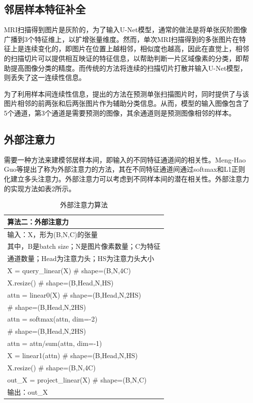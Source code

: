 \documentclass[letterpaper, 10pt, conference, twoside]{ieeeconf}
\begin{document}
\subsection{邻居样本特征补全}
MRI扫描得到图片是灰阶的，为了输入U-Net模型，通常的做法是将单张灰阶图像广播到3个特征维上，以扩增张量维度。然而，单次MRI扫描得到的多张图片在特征上是连续变化的，即图片在位置上越相邻，相似度也越高，因此在直觉上，相邻的扫描切片可以提供相互映证的特征信息，以帮助判断一片区域像素的分类，即帮助提高图像分类的精度。而传统的方法将连续的扫描切片打散并输入U-Net模型，则丢失了这一连续性信息。

为了利用样本间连续性信息，提出的方法在预测单张扫描图片时，同时提供了与该图片相邻的前两张和后两张图片作为辅助分类信息。从而，模型的输入图像包含了5个通道，第3个通道是需要预测的图像，其余通道则是预测图像相邻的样本。

\subsection{外部注意力}
需要一种方法来建模邻居样本间，即输入的不同特征通道间的相关性。Meng-Hao Guo等\cite{EA}提出了称为外部注意力的方法，其在不同特征通道间通过softmax和L1正则化建立多头注意力。外部注意力可以考虑到不同样本间的潜在相关性。外部注意力的实现方法如表2所示。

\begin{table}[htbp]
  \centering
 \caption{外部注意力算法}
 \label{tab:Algorithm2}
 \begin{tabular}{l}
  \toprule
  \textbf{算法二：外部注意力} \\
  \midrule
    输入：X，形为(B,N,C)的张量 \\
    其中，B是batch size；N是图片像素数量；C为特征\\
    通道数量；Head为注意力头；HS为注意力头大小\\
    X = query\_linear(X)  \# shape=(B,N,4C)\\
    X.resize()  \# shape=(B,Head,N,HS)\\
    attn = linear0(X)  \# shape=(B,Head,N,2HS)\\
    \# shape=(B,Head,N,2HS)\\
    attn = softmax(attn, dim=-2)\\
    \# shape=(B,Head,N,2HS)\\
    attn = attn/sum(attn, dim=-1)\\
    X = linear1(attn)  \# shape=(B,Head,N,HS)\\
    X.resize()  \# shape=(B,N,4C)\\
    out\_X = project\_linear(X)  \# shape=(B,N,C)\\
    输出：out\_X\\
  \bottomrule
 \end{tabular}
\end{table}
\end{document}
